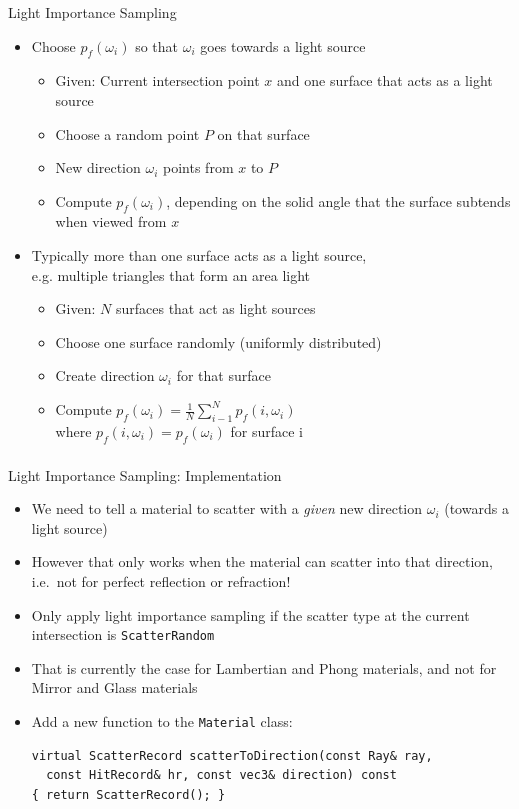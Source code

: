 \documentclass[utf8,stillsansserifmath,fleqn,t]{beamer}
\newcommand{\code}[1]{\texttt{#1}}
\newcommand{\ds}{\displaystyle}
\begin{document}
\begin{frame}[label=light-importance-sampling-1]
\frametitle{\insertsection}
Light Importance Sampling
\begin{itemize}
\item Choose $p_f(\omega_i)$ so that $\omega_i$ goes towards a light source
    \begin{itemize}
    \item Given: Current intersection point $x$ and one surface that acts as a light source
    \item Choose a random point $P$ on that surface
    \item New direction $\omega_i$ points from $x$ to $P$
    \item Compute $p_f(\omega_i)$, depending on the solid angle that the surface
    subtends when viewed from $x$
    \end{itemize}
\item Typically more than one surface acts as a light source,\\
e.g. multiple triangles that form an area light
    \begin{itemize}
    \item Given: $N$ surfaces that act as light sources
    \item Choose one surface randomly (uniformly distributed)
    \item Create direction $\omega_i$ for that surface
    \item Compute $\ds p_f(\omega_i) = \frac{1}{N}\sum_{i-1}^N p_f(i, \omega_i)$\\
    where $p_f(i, \omega_i) = p_f(\omega_i)$ for surface i
    \end{itemize}
\end{itemize}
\end{frame}

\begin{frame}[fragile]
\frametitle{\insertsection}
Light Importance Sampling: Implementation
\begin{itemize}
\item We need to tell a material to scatter with a \emph{given} new direction $\omega_i$ (towards a light source)
\item However that only works when the material can scatter into that direction, i.e.~not for
perfect reflection or refraction!
\item Only apply light importance sampling if the scatter type at the current
intersection is \code{ScatterRandom}
\item That is currently the case for Lambertian and Phong materials, and not for
Mirror and Glass materials
\item Add a new function to the \code{Material} class:
\begin{lstlisting}
virtual ScatterRecord scatterToDirection(const Ray& ray,
  const HitRecord& hr, const vec3& direction) const
{ return ScatterRecord(); }
\end{lstlisting}
\end{itemize}
\end{frame}
\end{document}
